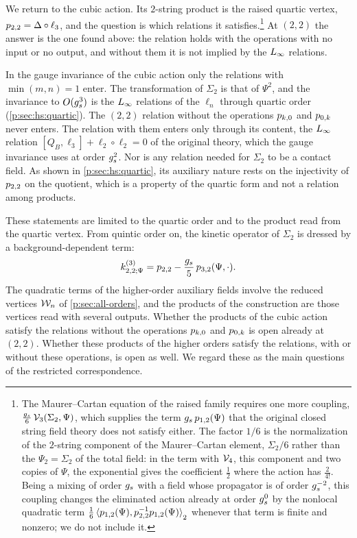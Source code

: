 We return to the cubic action.
Its $2$-string product is the raised quartic vertex, $\sprod{2}{2} = \Delta \circ \ell_3$, and the question is which \IBL{} relations it satisfies.\footnote{The Maurer--Cartan equation of the raised family requires one more coupling, $\tfrac{\gs}{6} \, \vertex{3}(\Sigma_2, \Psi)$, which supplies the term $\gs \, \sprod{1}{2}(\Psi)$ that the original closed string field theory does not satisfy either. The factor $1/6$ is the normalization of the $2$-string component of the Maurer--Cartan element, $\Sigma_2/6$ rather than the $\Psi_2 = \Sigma_2$ of the total field: in the term with $\vertex{4}$, this component and two copies of $\Psi$, the exponential gives the coefficient $\tfrac12$ where the action has $\tfrac{2}{4!}$. Being a mixing of order $\gs$ with a field whose propagator is of order $\gs^{-2}$, this coupling changes the eliminated action already at order $\gs^0$ by the nonlocal quadratic term $\tfrac{1}{6} \pair[2]{\sprod{1}{2}(\Psi)}{\sprod{2}{2}^{-1} \sprod{1}{2}(\Psi)}$ whenever that term is finite and nonzero; we do not include it.}
At $(2, 2)$ the answer is the one found above: the relation holds with the operations with no input or no output, and without them it is not implied by the $\Loo$ relations.

In the gauge invariance of the cubic action only the relations with $\min(m, n) = 1$ enter.
The transformation of $\Sigma_2$ is that of $\Psi^2$, and the invariance to $O(\gs^3)$ is the $\Loo$ relations of the $\ell_n$ through quartic order (\cref{p:sec:hs:quartic}).
The $(2, 2)$ relation without the operations $\sprod{k}{0}$ and $\sprod{0}{k}$ never enters.
The relation with them enters only through its content, the $\Loo$ relation $[Q_B, \ell_3] + \ell_2 \circ \ell_2 = 0$ of the original theory, which the gauge invariance uses at order $\gs^2$.
Nor is any \IBL{} relation needed for $\Sigma_2$ to be a contact field.
As shown in \cref{p:sec:hs:quartic}, its auxiliary nature rests on the injectivity of $\sprod{2}{2}$ on the quotient, which is a property of the quartic form and not a relation among products.

These statements are limited to the quartic order and to the product read from the quartic vertex.
From quintic order on, the kinetic operator of $\Sigma_2$ is dressed by a background-dependent term:
  \begin{equation}
  \kin{2}{\Psi}{3}
    = \sprod{2}{2}
      - \frac{\gs}{5} \, \sprod{3}{2}(\Psi, \cdot).
\end{equation}
The quadratic terms of the higher-order auxiliary fields involve the reduced vertices $\dvertex{n}$ of \cref{p:sec:all-orders}, and the products of the construction are those vertices read with several outputs.
Whether the products of the cubic action satisfy the relations without the operations $\sprod{k}{0}$ and $\sprod{0}{k}$ is open already at $(2, 2)$.
Whether these products of the higher orders satisfy the relations, with or without these operations, is open as well.
We regard these as the main questions of the restricted correspondence.


